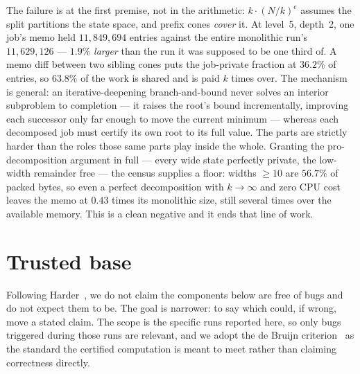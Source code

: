 \documentclass[11pt,a4paper]{article}
\theoremstyle{plain}
\theoremstyle{definition}
\theoremstyle{remark}
\begin{document}
The failure is at the first premise, not in the arithmetic: $k \cdot (N/k)^e$
assumes the split partitions the state space, and prefix cones \emph{cover} it.
At level~5, depth~2, one job's memo held $11{,}849{,}694$ entries against the
entire monolithic run's $11{,}629{,}126$ --- $1.9\%$ \emph{larger} than the run
it was supposed to be one third of. A memo diff between two sibling cones puts
the job-private fraction at $36.2\%$ of entries, so $63.8\%$ of the work is
shared and is paid $k$ times over. The mechanism is general: an
iterative-deepening branch-and-bound never solves an interior subproblem to
completion --- it raises the root's bound incrementally, improving each
successor only far enough to move the current minimum --- whereas each
decomposed job must certify its own root to its full value. The parts are
strictly harder than the roles those same parts play inside the whole. Granting
the pro-decomposition argument in full --- every wide state perfectly private,
the low-width remainder free --- the census supplies a floor: widths $\ge 10$
are $56.7\%$ of packed bytes, so even a perfect decomposition with
$k \to \infty$ and zero CPU cost leaves the memo at $0.43$ times its monolithic
size, still several times over the available memory. This is a clean negative
and it ends that line of work.

\section{Trusted base}\label{sec:trust}

Following Harder~\cite{Harder20}, we do not claim the components below are free
of bugs and do not expect them to be. The goal is narrower: to say which could,
if wrong, move a stated claim. The scope is the specific runs reported here, so
only bugs triggered during those runs are relevant, and we adopt the de Bruijn
criterion~\cite{BW05} as the standard the certified computation is meant to
meet rather than claiming correctness directly.
\end{document}
